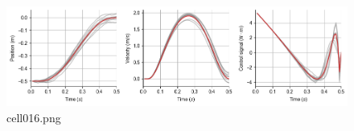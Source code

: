 \begin{figure}[ht]
	\centering
	\includegraphics[scale=0.8, max width=\linewidth]{./fig/motor-learning/biological-ofc/cell016.png}
	\caption{cell016.png}
	\label{cell016.png}
\end{figure}